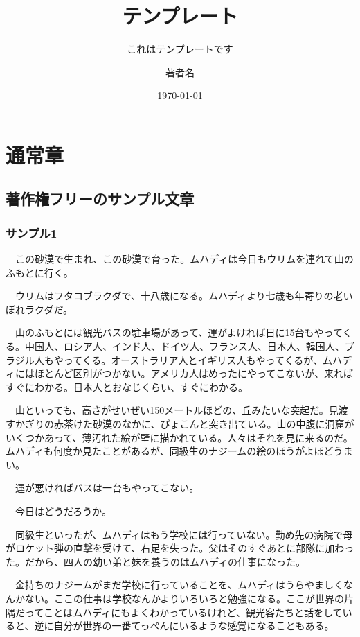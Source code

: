 \documentclass[11pt,a4paper,openright]{ltjsbook}
\title{テンプレート}
\subtitle{これはテンプレートです}
\author{著者名}
\date{\today}
\begin{document}
\maketitle

\tableofcontents

\chapter{通常章}

\section{著作権フリーのサンプル文章}

\subsection{サンプル1}

　この砂漠で生まれ、この砂漠で育った。ムハディは今日もウリムを連れて山のふもとに行く。

　ウリムはフタコブラクダで、十八歳になる。ムハディより七歳も年寄りの老いぼれラクダだ。

　山のふもとには観光バスの駐車場があって、運がよければ日に15台もやってくる。中国人、ロシア人、インド人、ドイツ人、フランス人、日本人、韓国人、ブラジル人もやってくる。オーストラリア人とイギリス人もやってくるが、ムハディにはほとんど区別がつかない。アメリカ人はめったにやってこないが、来ればすぐにわかる。日本人とおなじくらい、すぐにわかる。

　山といっても、高さがせいぜい150メートルほどの、丘みたいな突起だ。見渡すかぎりの赤茶けた砂漠のなかに、ぴょこんと突き出ている。山の中腹に洞窟がいくつかあって、薄汚れた絵が壁に描かれている。人々はそれを見に来るのだ。ムハディも何度か見たことがあるが、同級生のナジームの絵のほうがよほどうまい。

　運が悪ければバスは一台もやってこない。

　今日はどうだろうか。

　同級生といったが、ムハディはもう学校には行っていない。勤め先の病院で母がロケット弾の直撃を受けて、右足を失った。父はそのすぐあとに部隊に加わった。だから、四人の幼い弟と妹を養うのはムハディの仕事になった。

　金持ちのナジームがまだ学校に行っていることを、ムハディはうらやましくなんかない。ここの仕事は学校なんかよりいろいろと勉強になる。ここが世界の片隅だってことはムハディにもよくわかっているけれど、観光客たちと話をしていると、逆に自分が世界の一番てっぺんにいるような感覚になることもある。
\end{document}
